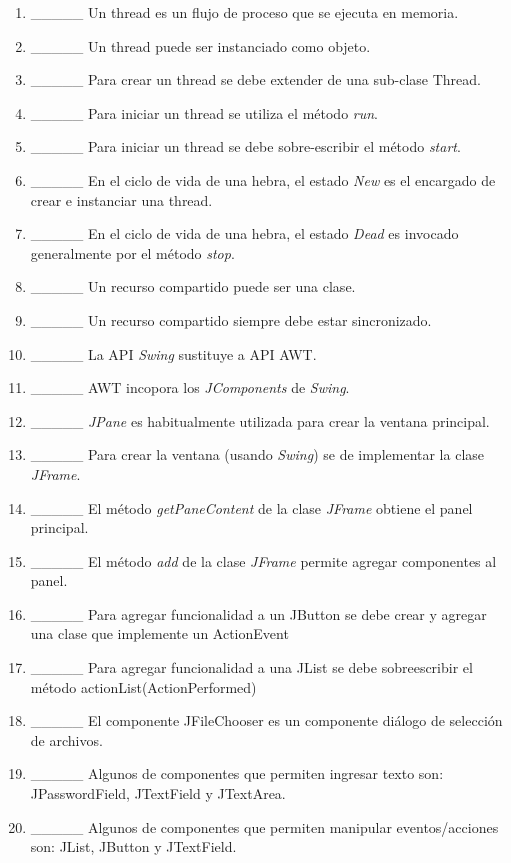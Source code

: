 \documentclass[10pt]{article}
\begin{document}
{\begin{enumerate}
		\begin{enumerate}
            \item \_\_\_\_\_ Un thread es un flujo de proceso que se ejecuta en memoria.
            \item \_\_\_\_\_ Un thread puede ser instanciado como objeto.
            \item \_\_\_\_\_ Para crear un thread se debe extender de una sub-clase Thread.
            \item \_\_\_\_\_ Para iniciar un thread se utiliza el m\'etodo \emph{run}. 
            \item \_\_\_\_\_ Para iniciar un thread se debe sobre-escribir el m\'etodo \emph{start}.
            \item \_\_\_\_\_ En el ciclo de vida de una hebra, el estado \emph{New} es el encargado de crear e instanciar una thread.
            \item \_\_\_\_\_ En el ciclo de vida de una hebra, el estado \emph{Dead} es invocado generalmente por el m\'etodo \emph{stop}.
            \item \_\_\_\_\_ Un recurso compartido puede ser una clase.
            \item \_\_\_\_\_ Un recurso compartido siempre debe estar sincronizado.
            \item \_\_\_\_\_ La API \emph{Swing} sustituye a API AWT.
            \item \_\_\_\_\_ AWT incopora los \emph{JComponents} de \emph{Swing}.
            \item \_\_\_\_\_ \emph{JPane} es habitualmente utilizada para crear la ventana principal.
            \item \_\_\_\_\_ Para crear la ventana (usando \emph{Swing}) se de implementar la clase \emph{JFrame}.
            \item \_\_\_\_\_ El m\'etodo \emph{getPaneContent} de la clase \emph{JFrame} obtiene el panel principal.
            \item \_\_\_\_\_ El m\'etodo \emph{add} de la clase \emph{JFrame} permite agregar componentes al panel.
            \item \_\_\_\_\_ Para agregar funcionalidad a un JButton se debe crear y agregar una clase que implemente un ActionEvent
            \item \_\_\_\_\_ Para agregar funcionalidad a una JList se debe sobreescribir el m\'etodo actionList(ActionPerformed)
            \item \_\_\_\_\_ El componente JFileChooser es un componente di\'alogo de selecci\'on de archivos.
            \item \_\_\_\_\_ Algunos de componentes que permiten ingresar texto son: JPasswordField, JTextField y JTextArea.
            \item \_\_\_\_\_ Algunos de componentes que permiten manipular eventos/acciones son: JList, JButton y JTextField.
        \end{enumerate}


\end{enumerate}}
\end{document}
